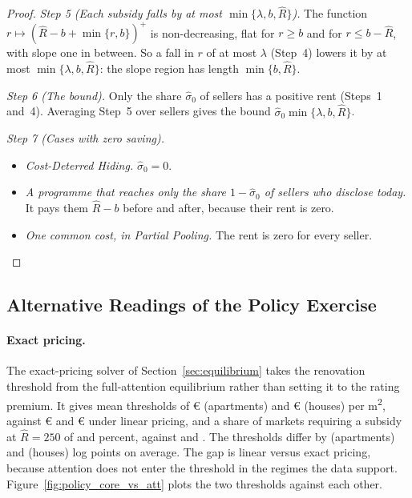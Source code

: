 \begin{proof}
\emph{Step 5 (Each subsidy falls by at most $\min\{\lambda,b,\hat R\}$).} The function $r\mapsto(\hat R-b+\min\{r,b\})^+$ is non-decreasing, flat for $r\ge b$ and for $r\le b-\hat R$, with slope one in between. So a fall in $r$ of at most $\lambda$ (Step~4) lowers it by at most $\min\{\lambda,b,\hat R\}$: the slope region has length $\min\{b,\hat R\}$.

\emph{Step 6 (The bound).} Only the share $\hat\sigma_0$ of sellers has a positive rent (Steps~1 and~4). Averaging Step~5 over sellers gives the bound $\hat\sigma_0\min\{\lambda,b,\hat R\}$.

\emph{Step 7 (Cases with zero saving).}
\begin{itemize}
    \item \emph{Cost-Deterred Hiding.} $\hat\sigma_0=0$.
    \item \emph{A programme that reaches only the share $1-\hat\sigma_0$ of sellers who disclose today.} It pays them $\hat R-b$ before and after, because their rent is zero.
    \item \emph{One common cost, in Partial Pooling.} The rent is zero for every seller.
\end{itemize}
\end{proof}

\subsection*{Alternative Readings of the Policy Exercise}

\paragraph{Exact pricing.}
The exact-pricing solver of Section~\ref{sec:equilibrium} takes the renovation threshold from the full-attention equilibrium rather than setting it to the rating premium. It gives mean thresholds of \euro{}\attRbarCoreEurTwoFiftyApt{} (apartments) and \euro{}\attRbarCoreEurTwoFiftyHouse{} (houses) per m\textsuperscript{2}, against \euro{}\attScBaseRbarApt{} and \euro{}\attScBaseRbarHouse{} under linear pricing, and a share of markets requiring a subsidy at $\hat R=250$ of \attSharePosCoreTwoFiftyApt{} and \attSharePosCoreTwoFiftyHouse{} percent, against \attScBaseShareTwoFiftyApt{} and \attScBaseShareTwoFiftyHouse{}. The thresholds differ by \attRbarGapApt{} (apartments) and \attRbarGapHouse{} (houses) log points on average. The gap is linear versus exact pricing, because attention does not enter the threshold in the regimes the data support. Figure~\ref{fig:policy_core_vs_att} plots the two thresholds against each other.

